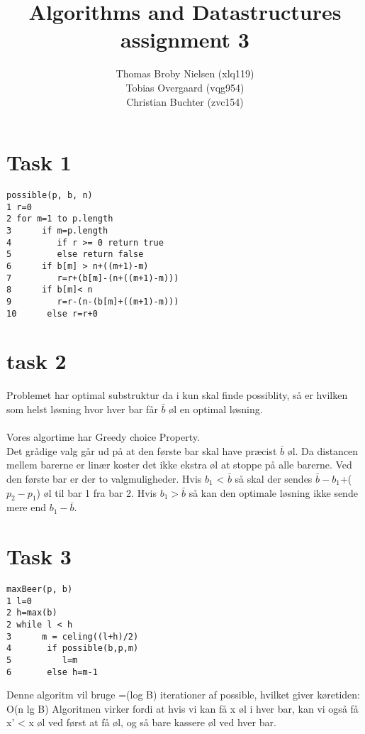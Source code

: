 \documentclass[12pt]{article}
\title{Algorithms and Datastructures assignment 3}
\author{Thomas Broby Nielsen (xlq119)\\ Tobias Overgaard (vqg954)\\ Christian Buchter (zvc154)}
\begin{document}
\maketitle

\tableofcontents

\pagebreak
\section{Task 1}
\begin{verbatim}
possible(p, b, n)
1 r=0
2 for m=1 to p.length
3      if m=p.length
4         if r >= 0 return true
5         else return false
6      if b[m] > n+((m+1)-m)
7         r=r+(b[m]-(n+((m+1)-m)))
8      if b[m]< n
9         r=r-(n-(b[m]+((m+1)-m)))
10      else r=r+0

\end{verbatim}
\newpage
\section{task 2}
Problemet har optimal substruktur da i kun skal finde possiblity, så er hvilken som helst løsning hvor hver bar får  $\bar{b}$ øl en optimal løsning.\\\\
Vores algortime har Greedy choice Property.\\
Det grådige valg går ud på at den første bar skal have præcist  $\bar{b}$ øl. Da distancen mellem barerne er linær koster det ikke ekstra øl at stoppe på alle barerne. Ved den første bar er der to valgmuligheder. Hvis $b_1$ <  $\bar{b}$ så skal der sendes  $\bar{b}-$$b_1$+($p_2-p_1$) øl til bar 1 fra bar 2. Hvis $b_1 >  \bar{b}$ så kan den optimale løsning ikke sende mere end $b_1- \bar{b}$.

\newpage
\section{Task 3}
\begin{verbatim}
maxBeer(p, b)
1 l=0
2 h=max(b)
2 while l < h
3      m = celing((l+h)/2)
4       if possible(b,p,m)
5          l=m
6       else h=m-1
\end{verbatim}
Denne algoritm vil bruge =(log B) iterationer af possible, hvilket giver køretiden: O(n lg B) Algoritmen virker fordi at hvis vi kan få x øl i hver bar, kan vi også få x' < x øl ved først at få  øl, og så bare kassere øl ved hver bar.
\end{document}
